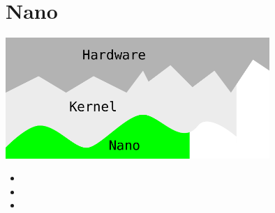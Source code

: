 \section{Nano}
\begin{frame}
\begin{center}
\includegraphics[width=0.75\textwidth]{nano.pdf}
\end{center}
\begin{itemize}
 \item {}
 \item {}
 \item {}
\end{itemize}
\end{frame}
